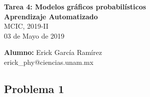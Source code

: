 \documentclass[letterpaper,11pt]{article}
\author{Erick García Ramírez}
\begin{document}
\begin{flushleft}
    {\bf Tarea 4: Modelos gráficos probabilísticos}\\
    {\bf Aprendizaje Automatizado}\\
    {MCIC, 2019-II}\\
    03 de Mayo de 2019
\end{flushleft}
\vspace{-6\baselineskip}
\begin{flushright}
    {\bf Alumno:} Erick García Ramírez\\
     erick\_phy@ciencias.unam.mx\\
\end{flushright}
\vspace{2\baselineskip}
\subsection*{Problema 1}
\end{document}
